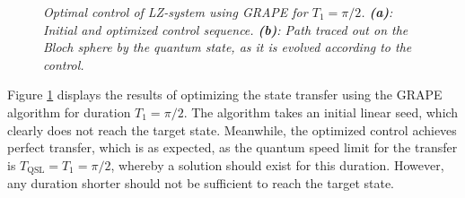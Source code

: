 \begin{figure}[h!]
\caption{\textit{Optimal control of LZ-system using GRAPE for $T_1 = \pi / 2$. \textbf{(a)}: Initial and optimized control sequence. \textbf{(b)}: Path traced out on the Bloch sphere by the quantum state, as it is evolved according to the control.}}
\label{fig:LZopt1}
\end{figure}
Figure \ref{fig:LZopt1} displays the results of optimizing the state transfer using the GRAPE algorithm for duration $T_1 = \pi / 2$. The algorithm takes an initial linear seed, which clearly does not reach the target state. Meanwhile, the optimized control achieves perfect transfer, which is as expected, as the quantum speed limit for the transfer is $T_{\mathrm{QSL}} = T_1 = \pi / 2$, whereby a solution should exist for this duration. However, any duration shorter should not be sufficient to reach the target state.\\ 
